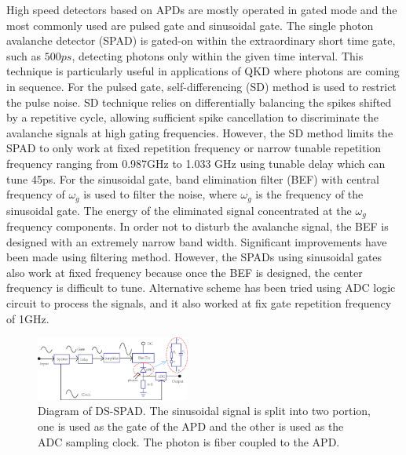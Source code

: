 \documentclass[%
 reprint,
superscriptaddress,
 amsmath,amssymb,
 aps,
]{revtex4-1}
\begin{document}
High speed detectors based on APDs are mostly operated in gated mode and the most commonly used are pulsed gate\cite{ZLYuan-DS2007} and sinusoidal gate\cite{NKata-sine2006,Jiang2017Wen-Hao-Jiang}. The single photon avalanche detector (SPAD) is gated-on within the extraordinary short time gate, such as $500ps$, detecting photons only within the given time interval. This technique is particularly useful in applications of QKD where photons are coming in sequence. %
For the pulsed gate, self-differencing (SD) method is used to restrict the pulse noise\cite{ZLYuan-DS2007,HPZeng-DS2009,Beom-gated2011}. SD technique relies on differentially balancing the spikes shifted by a repetitive cycle, allowing sufficient spike cancellation to discriminate the avalanche signals at high gating frequencies. However, the SD method limits the SPAD to only work  at fixed repetition frequency \cite{ZLYuan-DS2007,HPZeng-DS2009,Beom-gated2011} or narrow tunable repetition frequency ranging from 0.987GHz to 1.033 GHz using tunable delay which can tune 45ps\cite{ZLYuan-Multi2010}. For the sinusoidal gate, band elimination filter (BEF) with central frequency of $\omega_g$ is used to filter the noise\cite{NKata-sine2006,NKata-sine2009,Pan-sine2012}, where $\omega_g$ is the frequency of the sinusoidal gate. The energy of the eliminated signal concentrated at the $\omega_g$  frequency components. In order not to disturb the avalanche signal, the BEF is designed with an extremely narrow band width. Significant improvements have been made  using filtering method\cite{NKata-sine2009,Comandar-55efficeincy2015,Pan-sine2012}. However, the SPADs using sinusoidal gates also work at fixed frequency because once the BEF is designed, the center frequency is difficult to tune. Alternative scheme has been tried using ADC logic circuit to process the signals\cite{Seigo-adc2007}, and it also worked at fix gate repetition frequency of 1GHz.

\begin{figure}
\centering
\includegraphics[width = 0.45\textwidth]{scheme.eps}%
\vskip -0.1in
\caption{\label{fig:diagram} Diagram of DS-SPAD. The sinusoidal signal is split into two portion, one is used as the gate of the APD and the other is used as the ADC sampling clock. The photon is fiber coupled to the APD.}
\vskip -0.2in
\end{figure}
\end{document}

